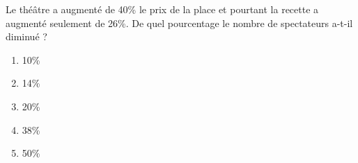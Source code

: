Le théâtre a augmenté de 40\% le prix de la place et pourtant la recette a augmenté seulement de 26\%. De quel pourcentage le nombre de spectateurs a-t-il diminué ?
\begin{multicols}{5}
\begin{enumerate}[A/]
\item 10\%
\item 14\%
\item 20\%
\item 38\%
\item 50\%
\end{enumerate}
\end{multicols}